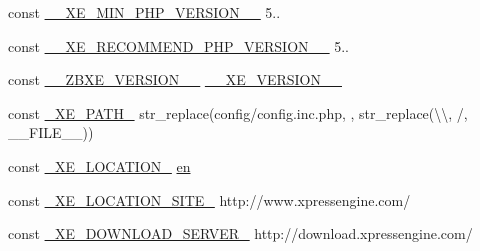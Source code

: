 \begin{DoxyCompactItemize}
\item 
const \hyperlink{config_8inc_8php_a9efd2b40fddf6f5bdc89660de1492f93}{\+\_\+\+\_\+\+X\+E\+\_\+\+M\+I\+N\+\_\+\+P\+H\+P\+\_\+\+V\+E\+R\+S\+I\+O\+N\+\_\+\+\_\+} \textquotesingle{}5..\textquotesingle{}
\item 
const \hyperlink{config_8inc_8php_a46828ee09f5bc69de2b897e3b605e9d8}{\+\_\+\+\_\+\+X\+E\+\_\+\+R\+E\+C\+O\+M\+M\+E\+N\+D\+\_\+\+P\+H\+P\+\_\+\+V\+E\+R\+S\+I\+O\+N\+\_\+\+\_\+} \textquotesingle{}5..\textquotesingle{}
\item 
const \hyperlink{config_8inc_8php_a0e70c145bf3712e075af5c3861045dc9}{\+\_\+\+\_\+\+Z\+B\+X\+E\+\_\+\+V\+E\+R\+S\+I\+O\+N\+\_\+\+\_\+} \hyperlink{config_8inc_8php_afceaaec30d0e5b6a78d0ae28bcbfc8f3}{\+\_\+\+\_\+\+X\+E\+\_\+\+V\+E\+R\+S\+I\+O\+N\+\_\+\+\_\+}
\item 
const \hyperlink{config_8inc_8php_a5387c7a3f2aa38adf16f324cee88db88}{\+\_\+\+X\+E\+\_\+\+P\+A\+T\+H\+\_\+} str\+\_\+replace(\textquotesingle{}config/config.\+inc.\+php\textquotesingle{}, \textquotesingle{}\textquotesingle{}, str\+\_\+replace(\textquotesingle{}\textbackslash{}\textbackslash{}\textquotesingle{}, \textquotesingle{}/\textquotesingle{}, \+\_\+\+\_\+\+F\+I\+L\+E\+\_\+\+\_\+))
\item 
const \hyperlink{config_8inc_8php_a7330debbfb3a027cdd5f3d3dd1dfbdd0}{\+\_\+\+X\+E\+\_\+\+L\+O\+C\+A\+T\+I\+O\+N\+\_\+} \textquotesingle{}\hyperlink{jquery-1_8x_8min_8js_a5d7a777130eac935addcf4926a74b23c}{en}\textquotesingle{}
\item 
const \hyperlink{config_8inc_8php_a063bfd2eb9f811b1676d0dbc0cad2648}{\+\_\+\+X\+E\+\_\+\+L\+O\+C\+A\+T\+I\+O\+N\+\_\+\+S\+I\+T\+E\+\_\+} \textquotesingle{}http\+://www.\+xpressengine.\+com/\textquotesingle{}
\item 
const \hyperlink{config_8inc_8php_a22df32d3e0eae0d60d6cddb9ec99d5ec}{\+\_\+\+X\+E\+\_\+\+D\+O\+W\+N\+L\+O\+A\+D\+\_\+\+S\+E\+R\+V\+E\+R\+\_\+} \textquotesingle{}http\+://download.\+xpressengine.\+com/\textquotesingle{}
\item 

\end{DoxyCompactItemize}
